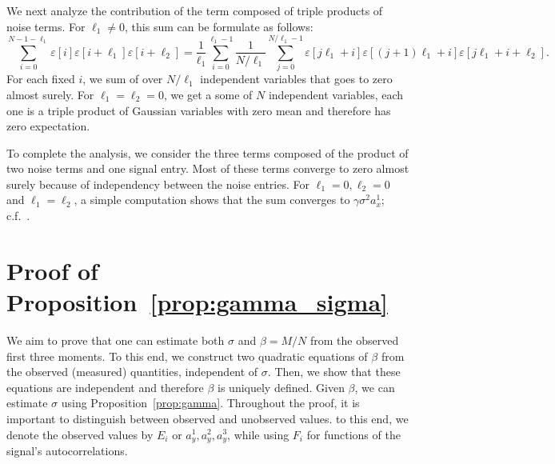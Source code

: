 \documentclass[english,11pt]{article}
\numberwithin{equation}{section}
\theoremstyle{plain}
\theoremstyle{definition}
\theoremstyle{remark}
\theoremstyle{plain}
\theoremstyle{remark}
\theoremstyle{plain}
\theoremstyle{plain}
\begin{document}
We next analyze the contribution of the term composed of triple products of noise terms. For $\ell_1\neq 0$, this sum can be formulate as follows:
\begin{equation*}
\sum_{i=0}^{N-1-\ell_1} \varepsilon[i]\varepsilon[i+\ell_1]\varepsilon[i+\ell_2] = \frac{1}{\ell_1}\sum_{i=0}^{\ell_1-1}\frac{1}{N/\ell_1}\sum_{j=0}^{N/\ell_1 -1 }\varepsilon[j\ell_1+i]\varepsilon[(j+1)\ell_1+i]\varepsilon[j\ell_1+i+\ell_2].
\end{equation*}
For each fixed $i$, we sum of over $N/\ell_1$ independent variables that goes to zero almost surely. For $\ell_1=\ell_2=0$, we get a some of $N$ independent variables, each one is a triple product of Gaussian variables with zero mean and therefore has zero expectation. 

To complete the analysis, we consider the three terms composed of the product of two noise terms and one signal entry. Most of these terms converge to zero almost surely because of independency between the noise entries. For $\ell_1=0, \ell_2=0$ and $\ell_1=\ell_2$,  a simple computation shows that the sum converges to $\gamma\sigma^2a_x^1$; c.f.~\cite{boumal2017heterogeneous}.



\section{Proof of Proposition~\ref{prop:gamma_sigma}} \label{sec:proof_prop_gamma_sigma}

We aim to prove that one can estimate both $\sigma$ and $\beta = M/N$ from the observed first three moments.
To this end, we construct two quadratic equations of $\beta$ from the observed (measured) quantities, independent of $\sigma$.
Then, we show that these equations are independent and therefore $\beta$ is uniquely defined. 
Given $\beta$, we can estimate $\sigma$ using Proposition~\ref{prop:gamma}.
Throughout the proof, it is important to distinguish between observed and unobserved values. 
to this end, we denote the observed values by $E_i$ or $a_y^1,a_y^2,a_y^3$, while using $F_i$ for functions of the signal's autocorrelations. 
\end{document}
